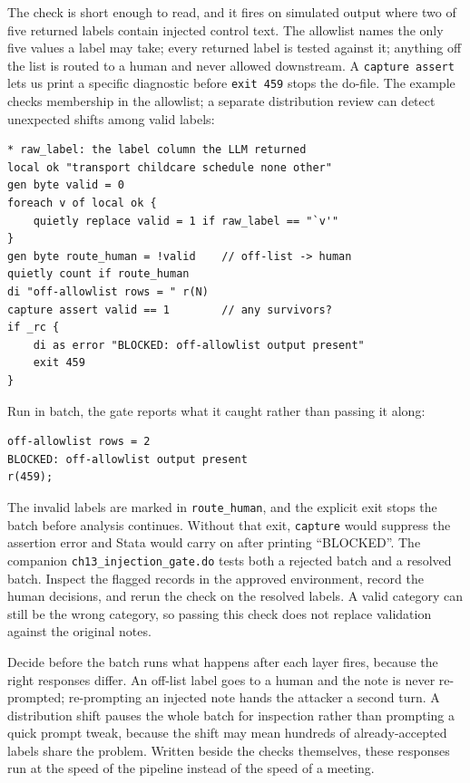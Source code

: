 The check is short enough to read, and it fires on simulated output where two of five returned labels contain injected control text. The allowlist names the only five values a label may take; every returned label is tested against it; anything off the list is routed to a human and never allowed downstream. A \texttt{capture assert} lets us print a specific diagnostic before \texttt{exit 459} stops the do-file. The example checks membership in the allowlist; a separate distribution review can detect unexpected shifts among valid labels:
\par
{\footnotesize
\begin{verbatim}
* raw_label: the label column the LLM returned
local ok "transport childcare schedule none other"
gen byte valid = 0
foreach v of local ok {
    quietly replace valid = 1 if raw_label == "`v'"
}
gen byte route_human = !valid    // off-list -> human
quietly count if route_human
di "off-allowlist rows = " r(N)
capture assert valid == 1        // any survivors?
if _rc {
    di as error "BLOCKED: off-allowlist output present"
    exit 459
}
\end{verbatim}
}
Run in batch, the gate reports what it caught rather than passing it along:
\par
{\footnotesize
\begin{verbatim}
off-allowlist rows = 2
BLOCKED: off-allowlist output present
r(459);
\end{verbatim}
}
The invalid labels are marked in \texttt{route\_human}, and the explicit exit stops the batch before analysis continues. Without that exit, \texttt{capture} would suppress the assertion error and Stata would carry on after printing \enquote{BLOCKED}. The companion \texttt{ch13\_injection\_gate.do} tests both a rejected batch and a resolved batch. Inspect the flagged records in the approved environment, record the human decisions, and rerun the check on the resolved labels. A valid category can still be the wrong category, so passing this check does not replace validation against the original notes.

Decide before the batch runs what happens after each layer fires, because the right responses differ. An off-list label goes to a human and the note is never re-prompted; re-prompting an injected note hands the attacker a second turn. A distribution shift pauses the whole batch for inspection rather than prompting a quick prompt tweak, because the shift may mean hundreds of already-accepted labels share the problem. Written beside the checks themselves, these responses run at the speed of the pipeline instead of the speed of a meeting.

